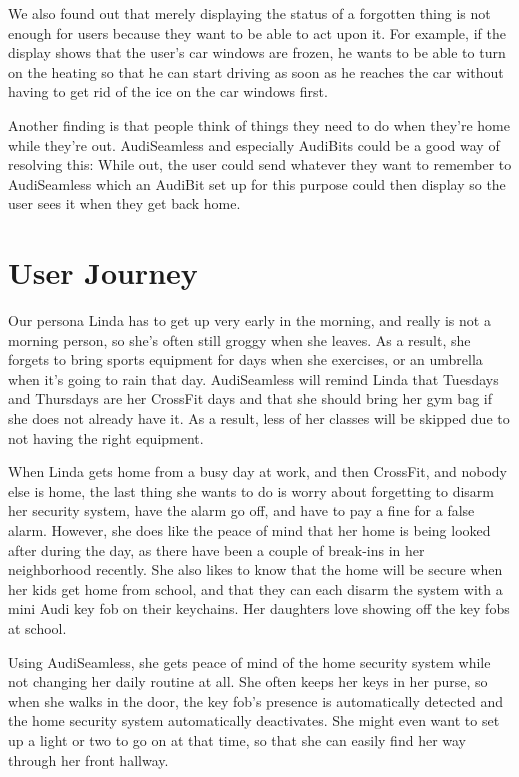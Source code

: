 We also found out that merely displaying the status of a forgotten thing is not enough for users because they want to be able to act upon it. For example, if the display shows that the user's car windows are frozen, he wants to be able to turn on the heating so that he can start driving as soon as he reaches the car without having to get rid of the ice on the car windows first.

Another finding is that people think of things they need to do when they're home while they're out. AudiSeamless and especially AudiBits could be a good way of resolving this: While out, the user could send whatever they want to remember to AudiSeamless which an AudiBit set up for this purpose could then display so the user sees it when they get back home.

\clearpage


\section{User Journey}
Our persona Linda has to get up very early in the morning, and really is not a morning person, so she's often still groggy when she leaves. As a result, she forgets to bring sports equipment for days when she exercises, or an umbrella when it's going to rain that day. AudiSeamless will remind Linda that Tuesdays and Thursdays are her CrossFit days and that she should bring her gym bag if she does not already have it. As a result, less of her classes will be skipped due to not having the right equipment.

When Linda gets home from a busy day at work, and then CrossFit, and nobody else is home, the last thing she wants to do is worry about forgetting to disarm her security system, have the alarm go off, and have to pay a fine for a false alarm. However, she does like the peace of mind that her home is being looked after during the day, as there have been a couple of break-ins in her neighborhood recently. She also likes to know that the home will be secure when her kids get home from school, and that they can each disarm the system with a mini Audi key fob on their keychains. Her daughters love showing off the key fobs at school.

Using AudiSeamless, she gets peace of mind of the home security system while not changing her daily routine at all. She often keeps her keys in her purse, so when she walks in the door, the key fob's presence is automatically detected and the home security system  automatically deactivates. She might even want to set up a light or two to go on at that time, so that she can easily find her way through her front hallway. 

